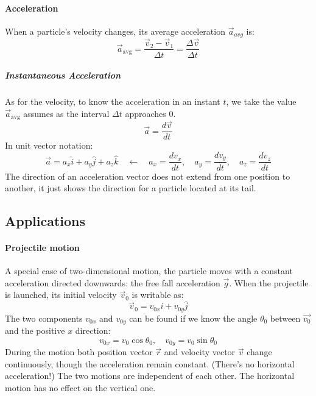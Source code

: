 \documentclass{scrartcl}
\begin{document}
    \paragraph{Acceleration} When a particle's velocity changes, its average acceleration $\vec{a}_{avg}$ is:
    \begin{equation}
        \vec{a}_{\mathrm{avg}} = \frac{\vec{v}_2 - \vec{v}_1}{\Delta t} = \frac{\Delta \vec{v} }{\Delta t}
    \end{equation}
    \subparagraph{Instantaneous Acceleration} As for the velocity, to know the acceleration in an instant $t$, we take the value $\vec{a}_{\mathrm{avg}}$ assumes as the interval $\Delta{t}$ approaches $0$.
    \begin{equation}
        \vec{a} = \frac{d\vec{v}}{dt}
    \end{equation}
    In unit vector notation:
    \begin{equation}
        \vec{a} = a_x \hat{i} + a_y \hat{j} + a_z \hat{k}\quad\leftarrow\quad a_x = \frac{dv_x}{dt},\quad a_y = \frac{dv_y}{dt},\quad a_z = \frac{dv_z}{dt}
    \end{equation}
    The direction of an acceleration vector does not extend from one position to another, it just shows the direction for a particle located at its tail.
    \subsection{Applications}
    \paragraph{Projectile motion} A special case of two-dimensional motion, the particle moves with a constant acceleration directed downwards: the free fall acceleration $\vec{g}$. When the projectile is launched, its initial velocity $\vec{v}_0$ is writable as: 
    \begin{equation}
        \vec{v}_0 = v_{0x} \hat{i} + v_{0y} \hat{j}
    \end{equation}
    The two components $v_{0x}$ and $v_{0y}$ can be found if we know the angle $\theta_0$ between $\vec{v_0}$ and the positive $x$ direction:
    \begin{equation}
        v_{0x} = v_0 \cos \theta_0,\quad v_{0y} = v_0\sin\theta_0
    \end{equation}
    During the motion both position vector $\vec{r}$ and velocity vector $\vec{v}$ change continuously, though the acceleration remain constant. (There's no horizontal acceleration!)
    The two motions are independent of each other. The horizontal motion has no effect on the vertical one.
    
\end{document}

